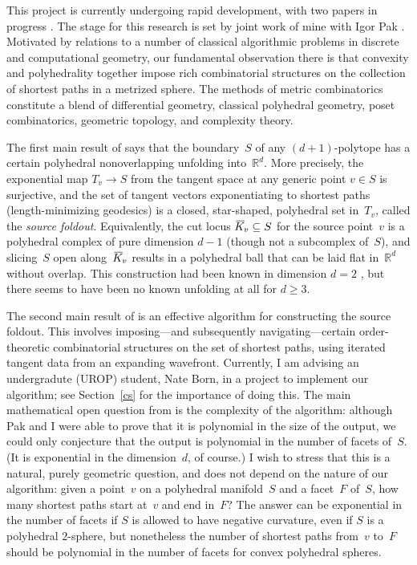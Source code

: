 \documentclass[11pt]{proposal}
\def\RR{{\mathbb R}}
\newcommand\KK{\hspace{.35ex}\ol{\hspace{-.35ex}K\hspace{-.05ex}}\hspace{.05ex}}
\newcommand\KKv{\KK_{\hspace{-.2ex}v}}
\def\ol#1{{\overline {#1}}}
\begin{document}
\label{s:metric}


This project is currently undergoing rapid development, with two
papers in progress \cite{unfolding,complexity}.  The stage for this
research is set by joint work of mine with Igor Pak \cite{fold}.
Motivated by relations to a number of classical algorithmic problems
in discrete and computational geometry, our fundamental observation
there is that convexity and polyhedrality together impose rich
combinatorial structures on the collection of shortest paths in a
metrized sphere.  The methods of metric combinatorics constitute a
blend of differential geometry, classical polyhedral geometry, poset
combinatorics, geometric topology, and complexity theory.

The first main result of \cite{fold} says that the boundary~$S$ of any
$(d+1)$-polytope has a certain polyhedral nonoverlapping unfolding
into~$\RR^d$.  More precisely, the exponential map $T_v \to S$ from
the tangent space at any generic point $v \in S$ is surjective, and
the set of tangent vectors exponentiating to shortest paths
(length-minimizing geodesics) is a closed, star-shaped, polyhedral set
in~$T_v$, called the \emph{source foldout}.  Equivalently, the cut
locus $\KKv \subseteq S$ for the source point~$v$ is a polyhedral
complex of pure dimension $d-1$ (though not a subcomplex of~$S$), and
slicing~$S$ open along~$\KKv$ results in a polyhedral ball that can be
laid flat in~$\RR^d$ without overlap.  This construction had been
known in dimension $d=2$ \cite{VP71,SS}, but there seems to have been
no known unfolding at all for $d \geq 3$.

The second main result of \cite{fold} is an effective algorithm for
constructing the source foldout.  This involves imposing---and
subsequently navigating---certain order-theoretic combinatorial
structures on the set of shortest paths, using iterated tangent data
from an expanding wavefront.  Currently, I am advising an undergradute
(UROP) student, Nate Born, in a project to implement our algorithm;
see Section~\ref{cs} for the importance of doing this.  The main
mathematical open question from \cite{fold} is the complexity of the
algorithm: although Pak and I were able to prove that it is polynomial
in the size of the output, we could only conjecture that the output is
polynomial in the number of facets of~$S$.  (It is exponential in the
dimension~$d$, of course.)  I wish to stress that this is a natural,
purely geometric question, and does not depend on the nature of our
algorithm: given a point~$v$ on a polyhedral manifold~$S$ and a
facet~$F$ of~$S$, how many shortest paths start at~$v$ and end in~$F$?
The answer can be exponential in the number of facets if $S$ is
allowed to have negative curvature, even if $S$ is a polyhedral
$2$-sphere, but nonetheless the number of shortest paths from~$v$
to~$F$ should be polynomial in the number of facets for convex
polyhedral spheres.
\end{document}
